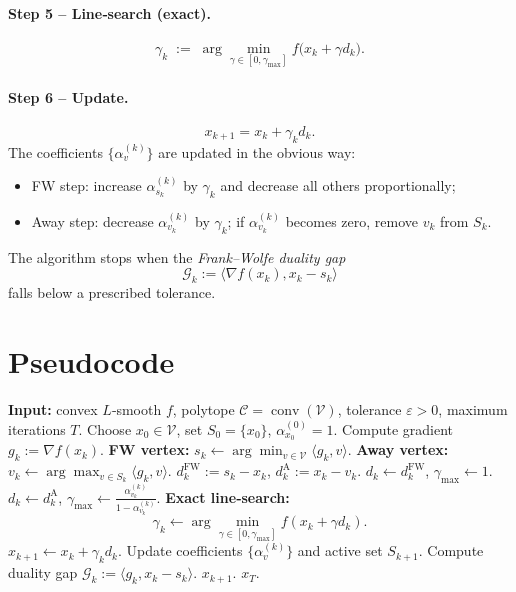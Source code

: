 \documentclass{article}
\newcommand{\C}{\mathcal{C}}
\newcommand{\V}{\mathcal{V}}
\newcommand{\gap}{\mathcal{G}}
\begin{document}
\paragraph{Step 5 – Line‑search (exact).}
\[
\gamma_k \;:=\;
\arg\min_{\gamma\in[0,\gamma_{\max}]}
f\!\bigl(x_k+\gamma d_k\bigr).
\tag{4}
\]

\paragraph{Step 6 – Update.}
\[
x_{k+1}=x_k+\gamma_k d_k .
\tag{5}
\]
The coefficients $\{\alpha_v^{(k)}\}$ are updated in the obvious way:
\begin{itemize}
\item FW step: increase $\alpha_{s_k}^{(k)}$ by $\gamma_k$ and decrease all others proportionally;
\item Away step: decrease $\alpha_{v_k}^{(k)}$ by $\gamma_k$; if $\alpha_{v_k}^{(k)}$ becomes zero, remove $v_k$ from $S_k$.
\end{itemize}
The algorithm stops when the \emph{Frank–Wolfe duality gap}
\[
\gap_k:=\langle\nabla f(x_k),x_k-s_k\rangle
\]
falls below a prescribed tolerance.

\section*{Pseudocode}
\begin{algorithm}[H]
\caption{Away‑Step Frank–Wolfe (AFW)}
\begin{algorithmic}[1]
\STATE \textbf{Input:} convex $L$‑smooth $f$, polytope $\C=\operatorname{conv}(\V)$,
tolerance $\varepsilon>0$, maximum iterations $T$.
\STATE Choose $x_0\in\V$, set $S_0=\{x_0\}$, $\alpha_{x_0}^{(0)}=1$.
    \STATE Compute gradient $g_k:=\nabla f(x_k)$.
    \STATE \textbf{FW vertex:} $s_k\gets\arg\min_{v\in\V}\langle g_k,v\rangle$.
    \STATE \textbf{Away vertex:} $v_k\gets\arg\max_{v\in S_k}\langle g_k,v\rangle$.
    \STATE $d_k^{\text{FW}}:=s_k-x_k$, $d_k^{\text{A}}:=x_k-v_k$.
        \STATE $d_k\gets d_k^{\text{FW}}$, $\gamma_{\max}\gets 1$.
    \ELSE
        \STATE $d_k\gets d_k^{\text{A}}$, 
        $\displaystyle\gamma_{\max}\gets\frac{\alpha_{v_k}^{(k)}}{1-\alpha_{v_k}^{(k)}}$.
    \ENDIF
    \STATE \textbf{Exact line‑search:}
    \[
    \gamma_k\gets\arg\min_{\gamma\in[0,\gamma_{\max}]}
    f(x_k+\gamma d_k).
    \]
    \STATE $x_{k+1}\gets x_k+\gamma_k d_k$.
    \STATE Update coefficients $\{\alpha_v^{(k)}\}$ and active set $S_{k+1}$.
    \STATE Compute duality gap $\gap_k:=\langle g_k,x_k-s_k\rangle$.
    \IF{$\gap_k\le\varepsilon$}
        \RETURN $x_{k+1}$.
    \ENDIF
\ENDFOR
\RETURN $x_T$.
\end{algorithmic}
\end{algorithm}
\end{document}
